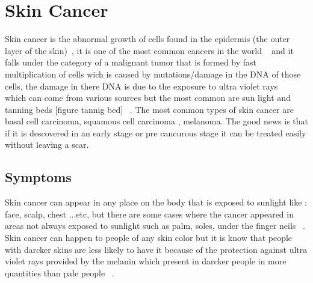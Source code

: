 \section{Skin Cancer}

        Skin cancer is the abnormal growth of cells found in the epidermis (the outer layer of the skin)~\cite{scf2022}, it is one of the most common cancers in the world ~\cite{nhs2020} and it falls under the category of a malignant tumor that is formed by fast multiplication of cells wich is caused by mutations/damage in the DNA  of those cells, the damage in there DNA is due to the exposure to ultra violet rays ~\cite{scf2022} which can come from various sources but the most common are sun light and tanning beds [figure tannig bed] ~\cite{mayo2020, scf2022, nhs2020}. The most common types of skin cancer are  basal cell carcinoma, squamous cell carcinoma , melanoma. The good news is that if it is descovered in an early stage or pre cancurous stage it can be treated easily without leaving a scar.



\subsection{Symptoms} 
        Skin cancer can appear in any place on the body that is exposed to sunlight like : face, scalp, chest ...etc, but there are some cases where the cancer appeared in areas not always exposed to sunlight such as  palm, soles, under the finger neils ~\cite{mayo2020}.
        Skin cancer can happen to people of any skin color but it is know that people with darcker skins are less likely to have it because of the protection against ultra violet rays provided by the melanin which present in darcker people in more quantities than pale people ~\cite{mayo2020}.

